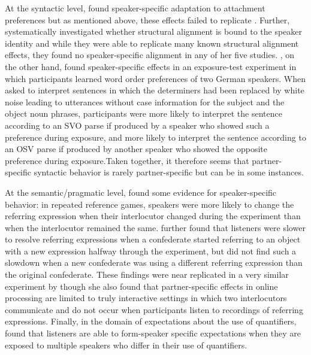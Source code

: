 At the syntactic level, \cite{Kamide2012} found speaker-specific adaptation to attachment preferences but as mentioned above, these effects failed to replicate \cite{Liu2017}. Further, 
\cite{OstrandFerreira2019} systematically investigated whether structural alignment is bound to the speaker identity and while they were able to replicate many known structural 
alignment effects, they found no speaker-specific alignment in any of her five studies. \cite{Krozcek2017}, on the other hand, found speaker-specific effects in an exposure-test experiment in which
participants learned word order preferences of two German speakers. When asked to interpret sentences in which the determiners had been replaced by white noise leading to utterances
without case information for the subject and the object noun phrases, participants were more likely to interpret the sentence according to an SVO parse if produced by a speaker who showed such a preference
during exposure, and more likely to interpret the sentence according to an OSV parse if produced by another speaker who showed the opposite preference during exposure.Taken together, it therefore seems that 
partner-specific syntactic behavior is rarely partner-specific but can be in some instances.

At the semantic/pragmatic level, \cite{BrennanClark1996} found some evidence for speaker-specific behavior: in repeated reference games, speakers were more likely to 
change the referring expression when their interlocutor changed during the experiment than when the interlocutor remained the same. \cite{MetzingBrennan2003} further
found that listeners were slower to resolve referring expressions when a confederate started referring to an object with a new expression halfway through the experiment, 
but did not find such a slowdown when a new confederate was using a different referring expression than the original confederate. These findings were near replicated 
in a very similar experiment by \cite{BrownSchmidt2009} though she also found that partner-specific effects in online processing are limited to truly interactive settings in which
two interlocutors communicate and do not occur when participants listen to recordings of referring expressions. Finally, in the domain of expectations about the use of quantifiers,
\cite{YildirimEtAl2016} found that listeners are able to form-speaker specific expectations when they are exposed to multiple speakers who differ in their use of quantifiers. 

